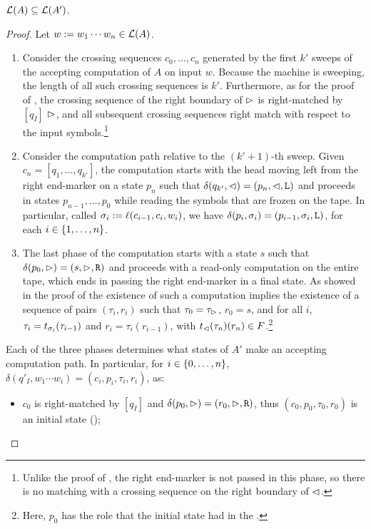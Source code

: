\begin{lemm}\label{lem:swkLAtoNFA-1}
	$\mathcal L(A)\subseteq\mathcal L(A')$.
\end{lemm}
\begin{proof}
	Let $w:=w_1\cdots w_n\in\mathcal L(A)$.
	\begin{enumerate}
		\item Consider the crossing sequences $c_0,\dots,c_n$ generated by the first $k'$ sweeps of the accepting computation of $A$ on input $w$.
		      Because the machine is sweeping, the length of all such crossing sequences is $k'$.
		      Furthermore, as for the proof of , the crossing sequence of the right boundary of $\rhd$ is right-matched by $[q_I]$ \wrt $\rhd$, and all subsequent crossing sequences right match with respect to the input symbols.\footnote{%
			      Unlike the proof of , the right end-marker is not passed in this phase, so there is no matching with a crossing sequence on the right boundary of $\lhd$.}
		\item Consider the computation path relative to the $(k'+1)$-th sweep.
		      Given $c_n=[q_1,\dots,q_{k'}]$, the computation starts with the head moving left from the right end-marker on a state $p_n$ such that $\delta(q_{k'},\lhd)=(p_n,\lhd,\mathtt L)$ and proceeds in states $p_{n-1},\dots,p_0$ while reading the symbols that are frozen on the tape.
		      In particular, called $\sigma_i:=\ell(c_{i-1},c_i,w_i)$, we have $\delta(p_i,\sigma_i)=(p_{i-1},\sigma_i,\mathtt L)$, for each $i\in\{1,\dots,n\}$.
		\item The last phase of the computation starts with a state $s$ such that $\delta(p_0,\rhd)=(s,\rhd,\mathtt R)$ and proceeds with a read-only computation on the entire tape, which ends in passing the right end-marker in a final state.
		      As showed in the proof of  the existence of such a computation implies the existence of a sequence of pairs $(\tau_i,r_i)$ such that $\tau_0=\tau_\rhd$, $r_0=s$, and for all $i$, $\tau_i=t_{\sigma_i}(\tau_{i-1})$ and $r_i=\tau_i(r_{i-1})$, with $t_\lhd(\tau_n)(r_n)\in F$.\footnote{%
			      Here, $p_0$ has the role that the initial state had in the \TDFA.}
	\end{enumerate}
	Each of the three phases determines what states of $A'$ make an accepting computation path. In particular, for $i\in\{0,\dots,n\}$, $\delta(q'_I,w_1\cdots w_i)=(c_i,p_i,\tau_i,r_i)$, as:
	\begin{itemize}
		\item $c_0$ is right-matched by $[q_I]$ and $\delta(p_0,\rhd)=(r_0,\rhd,\mathtt R)$, thus $(c_0,p_0,\tau_0,r_0)$ is an initial state ();

\end{itemize}
\end{proof}
